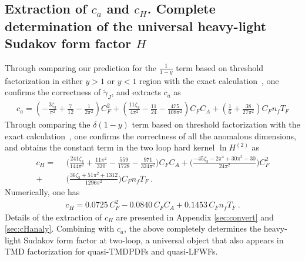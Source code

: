 \documentclass[a4paper,11pt]{article}
\begin{document}
\subsection{Extraction of $c_a$ and $c_H$. Complete determination of the universal heavy-light Sudakov form factor $H$}
Through comparing our prediction for the $\frac{1}{1-y}$ term based on threshold factorization in either $y>1$ or $y<1$ region with the exact calculation~\cite{Li:2020xml,Chen:2020ody}, one confirms the correctness of $\tilde \gamma_J$, and extracts $c_a$ as
\begin{align}\label{eq:resultca}
c_a = \left(-\frac{3 \zeta_3}{\pi ^2}+\frac{7}{12}-\frac{1}{2 \pi ^2}\right) C_F^2 + \left(\frac{11 \zeta_3}{4 \pi ^2}-\frac{11}{24}-\frac{475}{108 \pi ^2}\right) C_F C_A + \left(\frac{1}{6}+\frac{38}{27 \pi ^2}\right) C_F n_f T_F
\end{align}
Through comparing the $\delta(1-y)$ term based on threshold factorization with the exact calculation~\cite{Li:2020xml,Chen:2020ody}, one confirms the correctness of all the anomalous dimensions, and obtains the constant term in the two loop hard kernel $\ln H^{(2)}$ as 
\begin{align}\label{eq:resultcH}
c_H= \ \ &\bigg(\frac{241 \zeta_3}{144 \pi ^2}+\frac{11 \pi ^2}{320}-\frac{559}{1728}-\frac{971}{324 \pi ^2}\bigg)C_FC_A+\bigg(\frac{-45 \zeta_3-2 \pi ^4+30 \pi ^2-30}{24 \pi ^2}\bigg)C_F^2 \nonumber \\ 
+&\bigg(\frac{36 \zeta_3+51 \pi ^2+1312}{1296 \pi ^2}\bigg)C_Fn_fT_F \ .
\end{align}
Numerically, one has 
\begin{align}
c_H = 0.0725 \, C_F^2 - 0.0840 \, C_F C_A + 0.1453 \, C_F n_f T_F \ .
\end{align}
Details of the extraction of $c_H$ are presented in Appendix \ref{sec:convert} and \ref{sec:cHanaly}.  Combining with $c_a$, the above completely determines the heavy-light Sudakov form factor at two-loop, a universal object that also appears in TMD factorization for quasi-TMDPDFs and quasi-LFWFs.
\end{document}

